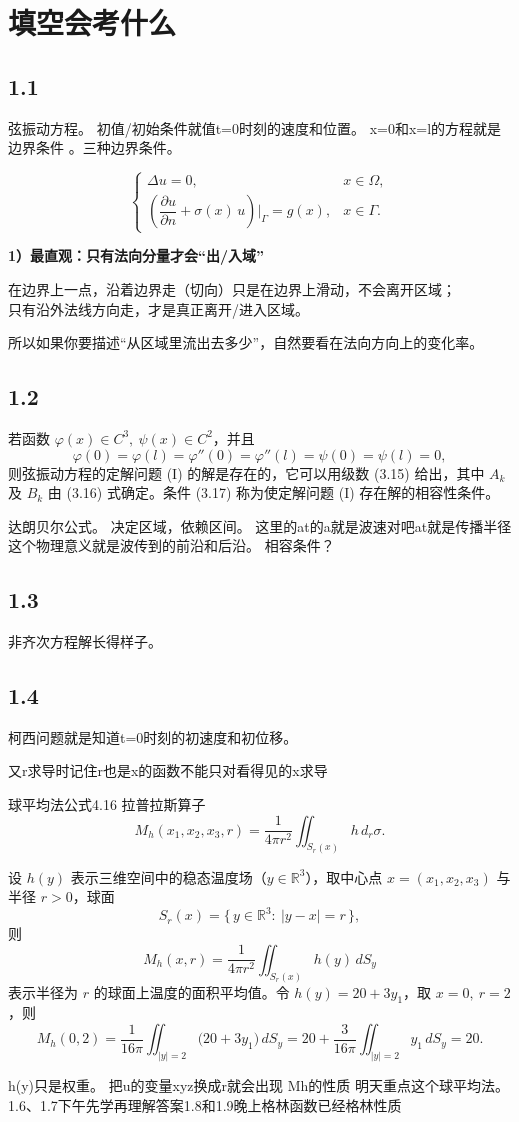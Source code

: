 \chapter{填空会考什么}
\section{1.1}
弦振动方程。
初值/初始条件就值t=0时刻的速度和位置。
x=0和x=l的方程就是边界条件
。三种边界条件。



\[
\begin{cases}
\Delta u=0, & x\in\Omega,\\[4pt]
\left(\dfrac{\partial u}{\partial n}+\sigma(x)\,u\right)\Big|_{\Gamma}=g(x), & x\in\Gamma.
\end{cases}
\]
\begin{dxtips}
    \textbf{1）最直观：只有法向分量才会“出/入域”}

在边界上一点，沿着边界走（切向）只是在边界上滑动，不会离开区域；\\
只有沿外法线方向走，才是真正离开/进入区域。

所以如果你要描述“从区域里流出去多少”，自然要看在法向方向上的变化率。
\end{dxtips}
\section{1.2}
\begin{theorem}[定理 3.1]
若函数 $\varphi(x)\in C^{3},\ \psi(x)\in C^{2}$，并且
\[
\varphi(0)=\varphi(l)=\varphi''(0)=\varphi''(l)=\psi(0)=\psi(l)=0,
\]
则弦振动方程的定解问题 (I) 的解是存在的，它可以用级数 (3.15) 给出，其中 $A_k$ 及 $B_k$
由 (3.16) 式确定。条件 (3.17) 称为使定解问题 (I) 存在解的相容性条件。
\end{theorem}
达朗贝尔公式。
决定区域，依赖区间。
这里的at的a就是波速对吧at就是传播半径这个物理意义就是波传到的前沿和后沿。
相容条件？
\section{1.3}
非齐次方程解长得样子。
\section{1.4}
柯西问题就是知道t=0时刻的初速度和初位移。
\begin{dxtips}
    又r求导时记住r也是x的函数不能只对看得见的x求导
\end{dxtips}
球平均法公式4.16
拉普拉斯算子
\[
M_h(x_1,x_2,x_3,r)=\frac{1}{4\pi r^{2}}\iint_{S_r(x)} h\, d_r\sigma .
\]
\begin{example}[球面平均的物理例子]
设 $h(y)$ 表示三维空间中的稳态温度场（$y\in\mathbb R^3$），取中心点 $x=(x_1,x_2,x_3)$ 与半径 $r>0$，球面
\[
S_r(x)=\{\,y\in\mathbb R^3:\ |y-x|=r\,\},
\]
则
\[
M_h(x,r)=\frac{1}{4\pi r^2}\iint_{S_r(x)} h(y)\,dS_y
\]
表示半径为 $r$ 的球面上温度的面积平均值。令 $h(y)=20+3y_1$，取 $x=0,\ r=2$，则
\[
M_h(0,2)=\frac{1}{16\pi}\iint_{|y|=2}\bigl(20+3y_1\bigr)\,dS_y
=20+\frac{3}{16\pi}\iint_{|y|=2}y_1\,dS_y=20.
\]
\end{example}
h(y)只是权重。
把u的变量xyz换成r就会出现
Mh的性质
明天重点这个球平均法。
1.6、1.7下午先学再理解答案1.8和1.9晚上格林函数已经格林性质
